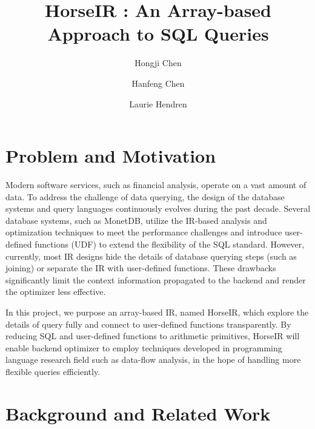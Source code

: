 \documentclass[sigplan]{acmart}
\begin{document}
\title{HorseIR : An Array-based Approach to SQL Queries}

\author{Hongji Chen}

\author{Hanfeng Chen}

\author{Laurie Hendren}

\maketitle

\section{Problem and Motivation}

Modern software services, such as financial analysis, operate on a vast amount
of data. To address the challenge of data querying, the design of the database
systems and query languages continuously evolves during the past decade.
Several database systems, such as MonetDB\cite{MonetDBHome}, utilize the
IR-based analysis and optimization techniques to meet the performance
challenges and introduce user-defined functions (UDF) to extend the
flexibility of the SQL standard.  However, currently, most IR designs hide the
details of database querying steps (such as joining) or separate the IR with
user-defined functions. These drawbacks significantly limit the context
information propagated to the backend and render the optimizer less effective. 

In this project, we purpose an array-based IR, named HorseIR, which explore the
details of query fully and connect to user-defined functions transparently. By
reducing SQL and user-defined functions to arithmetic primitives, HorseIR will
enable backend optimizer to employ techniques developed in programming language
research field such as data-flow analysis, in the hope of handling more
flexible queries efficiently. 

\section{Background and Related Work}
\end{document}
